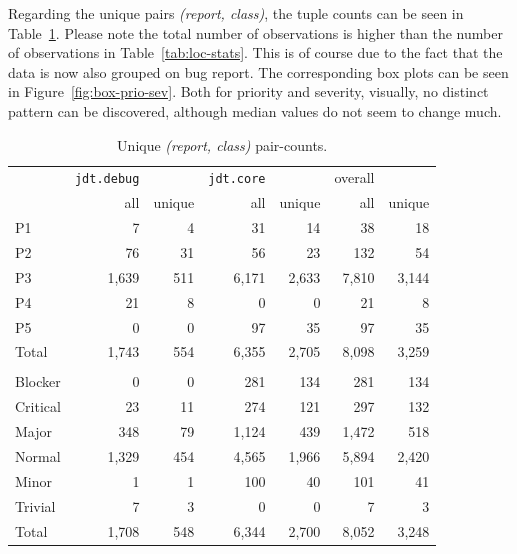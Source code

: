 Regarding the unique pairs \emph{(report, class)}, the tuple counts can be seen in Table~\ref{tab:prio-loc-counts}. Please note the total number of observations is higher than the number of observations in Table~\ref{tab:loc-stats}. This is of course due to the fact that the data is now also grouped on bug report. The corresponding box plots can be seen in Figure~\ref{fig:box-prio-sev}. Both for priority and severity, visually, no distinct pattern can be discovered, although median values do not seem to change much.

\begin{table}[!ht]\footnotesize
	\centering
	\begin{tabular}{lrrrrrr}
		\toprule
		 & \texttt{jdt.debug} &  & \texttt{jdt.core} &  & overall & \\
		 & all & unique & all & unique & all & unique\\
		\midrule
		P1 & 7 & 4 & 31 & 14 & 38 & 18\\
		P2 & 76 & 31 & 56 & 23 & 132 & 54\\
		P3 & 1,639 & 511 & 6,171 & 2,633 & 7,810 & 3,144\\
		P4 & 21 & 8 & 0 & 0 & 21 & 8\\
		P5 & 0 & 0 & 97 & 35 & 97 & 35\\
		\midrule
		Total & 1,743 & 554 & 6,355 & 2,705 & 8,098 & 3,259\\
		\midrule
		\\
		Blocker & 0 & 0 & 281 & 134 & 281 & 134\\
		Critical & 23 & 11 & 274 & 121 & 297 & 132\\
		Major & 348 & 79 & 1,124 & 439 & 1,472 & 518\\
		Normal & 1,329 & 454 & 4,565 & 1,966 & 5,894 & 2,420\\
		Minor & 1 & 1 & 100 & 40 & 101 & 41\\
		Trivial & 7 & 3 & 0 & 0 & 7 & 3\\
		\midrule
		Total & 1,708 & 548 & 6,344 & 2,700 & 8,052 & 3,248\\
		\bottomrule
	\end{tabular} 
	\caption{Unique \emph{(report, class)} pair-counts.}
	\label{tab:prio-loc-counts}
\end{table}

